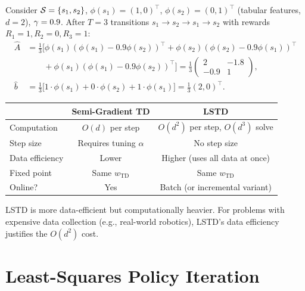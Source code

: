 \documentclass[11pt,a4paper]{article}
\begin{document}
\begin{example}
\label{ex:lstd}
Consider $\mathcal{S} = \{s_1, s_2\}$, $\phi(s_1) = (1,0)^\top$,
$\phi(s_2) = (0,1)^\top$ (tabular features, $d = 2$), $\gamma = 0.9$.
After $T = 3$ transitions $s_1 \to s_2 \to s_1 \to s_2$ with rewards
$R_1 = 1, R_2 = 0, R_3 = 1$:
\begin{align*}
  \hat{A} &= \frac{1}{3}\bigl[
    \phi(s_1)(\phi(s_1) - 0.9\phi(s_2))^\top
    + \phi(s_2)(\phi(s_2) - 0.9\phi(s_1))^\top \\
    &\qquad + \phi(s_1)(\phi(s_1) - 0.9\phi(s_2))^\top
  \bigr]
  = \frac{1}{3}\begin{pmatrix} 2 & -1.8 \\ -0.9 & 1 \end{pmatrix},\\
  \hat{b} &= \frac{1}{3}\bigl[1 \cdot \phi(s_1) + 0 \cdot \phi(s_2)
    + 1 \cdot \phi(s_1)\bigr]
  = \frac{1}{3}(2, 0)^\top.
\end{align*}
\end{example}

\begin{rlconnection}[title={LSTD vs.\ Semi-Gradient TD}]
\begin{center}
\begin{tabular}{lcc}
\toprule
& \textbf{Semi-Gradient TD} & \textbf{LSTD} \\
\midrule
Computation & $O(d)$ per step & $O(d^2)$ per step, $O(d^3)$ solve \\
Step size & Requires tuning $\alpha$ & No step size \\
Data efficiency & Lower & Higher (uses all data at once) \\
Fixed point & Same $w_{\mathrm{TD}}$ & Same $w_{\mathrm{TD}}$ \\
Online? & Yes & Batch (or incremental variant) \\
\bottomrule
\end{tabular}
\end{center}
LSTD is more data-efficient but computationally heavier. For problems
with expensive data collection (e.g., real-world robotics), LSTD's
data efficiency justifies the $O(d^2)$ cost.
\end{rlconnection}

\section{Least-Squares Policy Iteration}
\label{sec:lspi}
\end{document}
